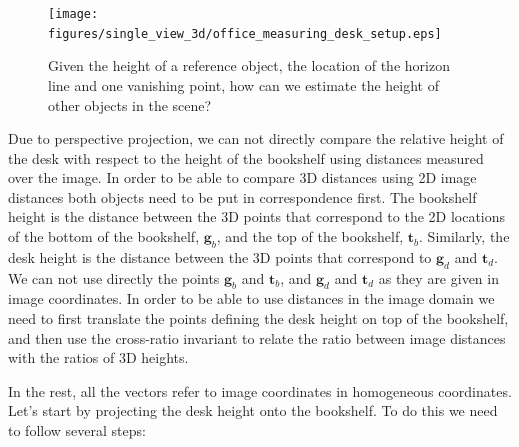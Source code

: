 \begin{figure}
\centerline{
\texttt{[image: figures/single\_view\_3d/office\_measuring\_desk\_setup.eps]}
} 
\caption{Given the height of a reference object, the location of the horizon line and one vanishing point, how can we estimate the height of other objects in the scene?}
\label{fig:office_measuring_desk_setup}
\end{figure}

Due to perspective projection, we can not directly compare the relative height of the desk with respect to the height of the bookshelf using distances measured over the image. In order to be able to compare 3D distances using 2D image distances both objects need to be put in correspondence first. The bookshelf height is the distance between the 3D points that correspond to the 2D locations of the bottom of the bookshelf, $\mathbf{g}_b$, and the top of the bookshelf, $\mathbf{t}_b$. Similarly, the desk height is the distance between the 3D points that correspond to $\mathbf{g}_d$ and $\mathbf{t}_d$. We can not use directly the points $\mathbf{g}_b$ and $\mathbf{t}_b$, and  $\mathbf{g}_d$ and $\mathbf{t}_d$ as they are given in image coordinates. In order to be able to use distances in the image domain we need to first translate the points defining the desk height on top of the bookshelf, and then use the cross-ratio invariant to relate the ratio between image distances with the ratios of 3D heights. 




In the rest, all the vectors refer to image coordinates in homogeneous coordinates. Let's start by projecting the desk height onto the bookshelf. To do this we need to follow several steps: 

